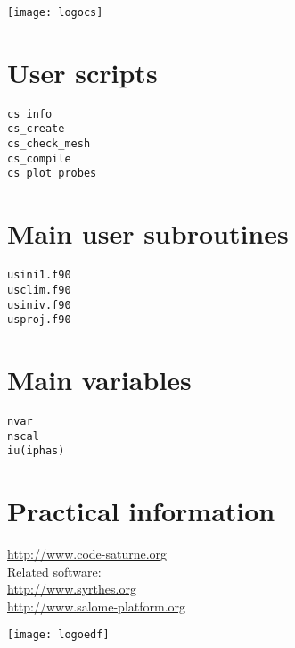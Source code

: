 \documentclass[a4paper,11pt]{article}
\begin{document}
\begin{multicols*}{3}

\begin{center}
  \texttt{[image: logocs]}
\end{center}

\section*{User scripts}
\texttt{cs\_info}\\
\texttt{cs\_create}\\
\texttt{cs\_check\_mesh}\\
\texttt{cs\_compile}\\
\texttt{cs\_plot\_probes}\\

\section*{Main user subroutines}
\texttt{usini1.f90}\\
\texttt{usclim.f90}\\
\texttt{usiniv.f90}\\
\texttt{usproj.f90}

\section*{Main variables}
\texttt{nvar}\\
\texttt{nscal}\\
\texttt{iu(iphas)}

\section*{Practical information}

\url{http://www.code-saturne.org}\\

Related software:\\
\url{http://www.syrthes.org}\\
\url{http://www.salome-platform.org}

\begin{center}
  \texttt{[image: logoedf]}
\end{center}

\end{multicols*}
\end{document}
